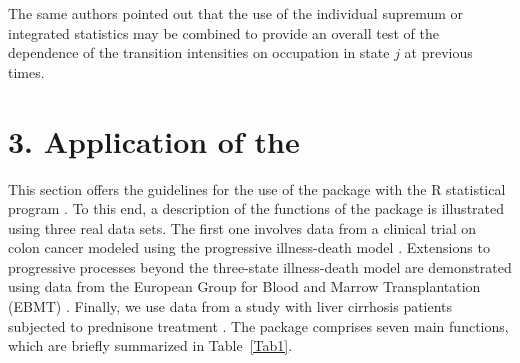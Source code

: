 


The same authors pointed out that the use of the individual supremum or integrated statistics may be combined to provide an overall test of the dependence of the transition intensities on occupation in state $j$ at previous times. 




\section[Application of the markovMSM]{3. Application of the } \label{sec: package}

This section offers the guidelines for the use of the  package with the R statistical program \citep{R}. To this end, a description of the functions of the package is illustrated using three real data sets. The first one involves data from a clinical trial on colon cancer modeled using the progressive illness-death model \citep{Moertel1995}. Extensions to progressive processes beyond the three-state illness-death model are demonstrated using data from the European Group for Blood and Marrow Transplantation (EBMT) \citep{Putter2007}. Finally, we use data from a study with liver cirrhosis patients subjected to prednisone treatment \citep{Andersen1993}. The package comprises seven main functions, which are briefly summarized in Table~\ref{Tab1}.  

